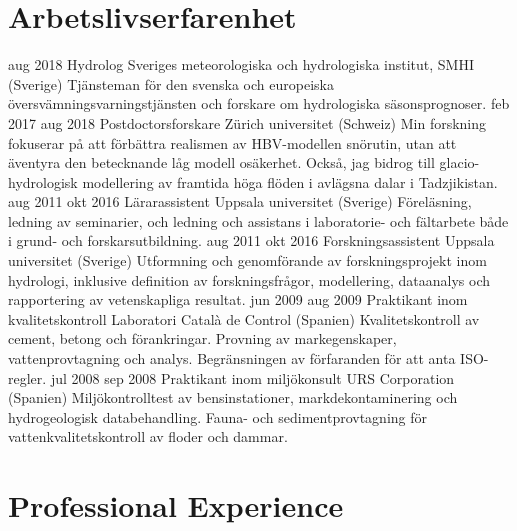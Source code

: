 \ifswedish
  \section{Arbetslivserfarenhet}
    \position
      {aug 2018 \textemdash{} }
      {Hydrolog}
      {Sveriges meteorologiska och hydrologiska institut, SMHI (Sverige)}
      {Tjänsteman för den svenska och europeiska översvämningsvarningstjänsten och forskare om hydrologiska säsonsprognoser.}
    \position
      {feb 2017 \textemdash{} aug 2018}
      {Postdoctorsforskare}
      {Zürich universitet (Schweiz)}
      {Min forskning fokuserar på att förbättra realismen av HBV-modellen snörutin, utan att äventyra den betecknande låg modell osäkerhet. Också, jag bidrog till glacio-hydrologisk modellering av framtida höga flöden i avlägsna dalar i Tadzjikistan.}
    \position
      {aug 2011 \textemdash{} okt 2016}
      {Lärarassistent}
      {Uppsala universitet (Sverige)}
      {Föreläsning, ledning av seminarier, och ledning och assistans i laboratorie- och fältarbete både i grund- och forskarsutbildning.}
    \position
      {aug 2011 \textemdash{} okt 2016}
      {Forskningsassistent}
      {Uppsala universitet (Sverige)}
      {Utformning och genomförande av forskningsprojekt inom hydrologi, inklusive definition av forskningsfrågor, modellering, dataanalys och rapportering av vetenskapliga resultat.}
    \position
      {jun 2009 \textemdash{} aug 2009}
      {Praktikant inom kvalitetskontroll}
      {Laboratori Català de Control (Spanien)}
      {Kvalitetskontroll av cement, betong och förankringar. Provning av markegenskaper, vattenprovtagning och analys. Begränsningen av förfaranden för att anta ISO-regler.}
    \position
      {jul 2008 \textemdash{} sep 2008}
      {Praktikant inom miljökonsult}
      {URS Corporation (Spanien)}
      {Miljökontrolltest av bensinstationer, markdekontaminering och hydrogeologisk databehandling. Fauna- och sedimentprovtagning för vattenkvalitetskontroll av floder och dammar.}
\else
  \section{Professional Experience}
   
